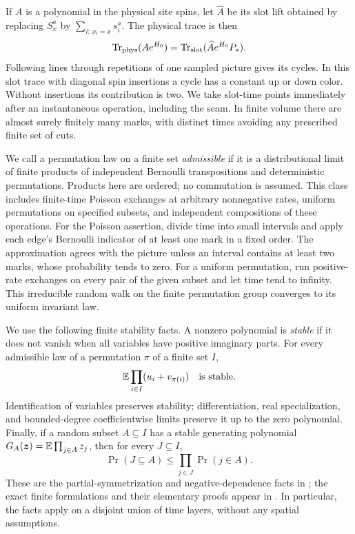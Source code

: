 If $A$ is a polynomial in the physical site spins, let $\widehat A$
be its slot lift obtained by replacing $S_x^a$ by
$\sum_{i:\,x_i=x}s_i^a$.  The physical trace is then
\begin{equation}\label{eq:physical-slot-trace}
       \operatorname{Tr}_{\rm phys}(Ae^{H_0})
          =\operatorname{Tr}_{\rm slot}(\widehat A e^{H_0}P_*).
\end{equation}
Following lines through repetitions of one sampled picture gives its
cycles.  In this slot trace with diagonal spin insertions a cycle has a constant
up or down color.  Without insertions its contribution is two.  We take
slot-time points immediately after an instantaneous operation, including
the seam.  In finite volume there are almost surely finitely many marks,
with distinct times avoiding any prescribed finite set of cuts.

We call a permutation law on a finite set \emph{admissible} if it is a
distributional limit of finite products of independent Bernoulli
transpositions and deterministic permutations.  Products here are ordered;
no commutation is assumed.  This class includes finite-time Poisson
exchanges at arbitrary nonnegative rates, uniform permutations on
specified subsets, and independent compositions of these operations.
For the Poisson assertion, divide time into small intervals and apply
each edge's Bernoulli indicator of at least one mark in a fixed order.
The approximation agrees with the picture unless an interval contains
at least two marks, whose probability tends to zero.  For a uniform
permutation, run positive-rate exchanges on every pair of the given
subset and let time tend to infinity.  This irreducible random walk on
the finite permutation group converges to its uniform invariant law.

We use the following finite stability facts.  A nonzero polynomial is
\emph{stable} if it does not vanish when all variables have positive
imaginary parts.  For every admissible law of a permutation $\pi$ of a
finite set $I$,
\begin{equation}\label{eq:stable-permutation-symbol}
              \mathbb E\prod_{i\in I}(u_i+v_{\pi(i)})
                    \quad\hbox{is stable}.
\end{equation}
Identification of variables preserves stability; differentiation, real
specialization, and bounded-degree coefficientwise limits preserve it
up to the zero polynomial.  Finally, if a random subset $A\subseteq I$
has a stable generating polynomial
$G_A(\boldsymbol z)=\mathbb E\prod_{j\in A}z_j$, then for every $J\subseteq I$,
\begin{equation}\label{eq:stable-presence}
            \Pr(J\subseteq A)\le\prod_{j\in J}\Pr(j\in A).
\end{equation}
These are the partial-symmetrization and negative-dependence facts in
\cite[Theorems~4.20 and~4.9]{BBL2009}; the exact finite formulations
and their elementary proofs appear in \cite[Lemmas~3.2--3.6]{Ord}.
In particular, the facts apply on a disjoint union of time layers,
without any spatial assumptions.


